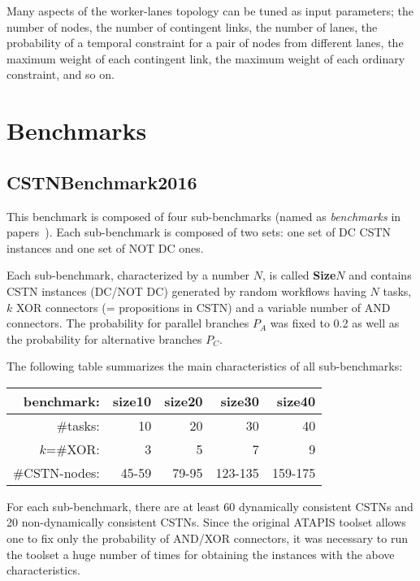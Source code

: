 \documentclass[a4paper,11pt]{article}
\begin{document}
Many aspects of the worker-lanes topology can be tuned as input parameters;  
the number of nodes, the number of contingent links, the number of lanes, the probability of a temporal constraint for a pair of nodes from different lanes, the maximum weight of each contingent link, the maximum weight of each ordinary constraint, and so on.



\section{Benchmarks}
\subsection{CSTNBenchmark2016}

This benchmark is composed of four sub-benchmarks (named as \textit{benchmarks} in papers~\cite{time2015,HunsbergerP16Icaps,CairoEtalTime2017,HunsbergerPFixed18,HunsbergerPEpsilon18,HunsbergerP20}).
Each sub-benchmark is composed of two sets: one set of DC CSTN instances and one set of NOT DC ones.

Each sub-benchmark, characterized by a number $N$, is called  \textbf{Size$N$} and contains CSTN instances (DC\slash NOT DC) generated by random workflows having $N$ tasks, $k$ XOR connectors (= propositions in CSTN) and a variable number of AND connectors. 
The probability for parallel branches $P_A$ was fixed to 0.2 as well as the probability for alternative branches $P_C$. 

The following table summarizes the main characteristics of all sub-benchmarks:
\begin{center}
\begin{tabular}{rrrrr}
	\hline
  \textbf{benchmark}: & \textbf{size10}	& \textbf{size20}	& \textbf{size30}	& \textbf{size40}\\
  \hline
  \#tasks: & 10 & 20 & 30 & 40 \\ 
  $k$=\#XOR: & 3 & 5 & 7 & 9\\%
  \#CSTN-nodes: & 45-59 &79-95& 123-135&159-175\\
  \hline
\end{tabular}
\end{center}
For each sub-benchmark, there are at least 60 dynamically consistent CSTNs and 20 non-dynamically consistent CSTNs.
Since the original ATAPIS toolset allows one to fix only the probability of AND\slash XOR connectors, it was necessary to run the toolset a huge number of times for obtaining the instances with the above characteristics.
\end{document}
